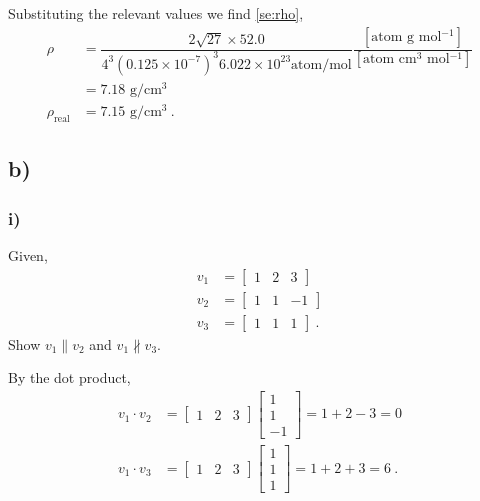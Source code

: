 \documentclass[a4paper]{article}
\begin{document}
		Substituting the relevant values we find \cref{se:rho},
		\begin{subequations}
		\begin{align}
			\rho &= \dfrac{2 \sqrt{27} \times 52.0}{4^{3} \left(0.125 \times 10^{-7} \right)^{3} 6.022 \times 10^{23} \textrm{atom/mol}} \dfrac{[\textrm{atom g mol$^{-1}$}]}{[\textrm{atom cm$^{3}$ mol$^{-1}$}]}\\
			     &= 7.18 \textrm{ g/cm$^{3}$} \label{se:rho}\\
			\rho_{\textrm{real}} &= 7.15 \textrm{ g/cm$^{3}$}~.
		\end{align}
		\end{subequations}
		
		\subsection{b)}
		\subsubsection{i)}
		Given, 
		\begin{align}
			v_{1} &= \begin{bmatrix}
					1 & 2 & 3
					\end{bmatrix}\\
			v_{2} &= \begin{bmatrix}
					1 & 1 & -1
					\end{bmatrix}\\
			v_{3} &= \begin{bmatrix}
					1 & 1 & 1
					\end{bmatrix}~.
		\end{align}
		Show $v_{1} \parallel v_{2}$ and $v_{1} \not\parallel v_{3}$.
		
		By the dot product,
		\begin{subequations}		
		\begin{align}
			v_{1} \cdot v_{2} &= \begin{bmatrix}
								1 & 2 & 3
								\end{bmatrix} 
								\begin{bmatrix}
								1\\
								1\\
								-1
								\end{bmatrix}
							    = 1 + 2 - 3 = 0\\
			v_{1} \cdot v_{3} &= \begin{bmatrix}
								1 & 2 & 3
								\end{bmatrix} 
								\begin{bmatrix}
								1\\
								1\\
								1
								\end{bmatrix}
								= 1 + 2 + 3 = 6~.
		\end{align}
		\end{subequations}
\end{document}
